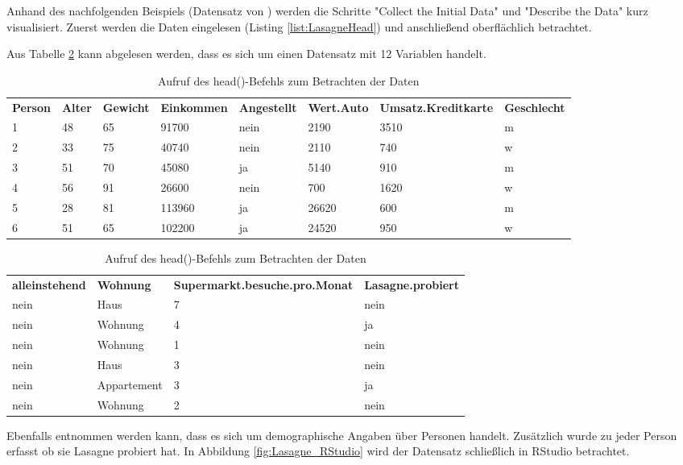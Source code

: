 Anhand des nachfolgenden Beispiels (Datensatz von \citep[Case Lasagne Test.xlsx]{hertle_datenanalyse_2016}) werden die Schritte "Collect the Initial Data" und "Describe the Data" kurz visualisiert. Zuerst werden die Daten eingelesen (Listing \ref{list:LasagneHead}) und anschließend oberflächlich betrachtet.

Aus Tabelle \ref{tab:LasagneHead:output} kann abgelesen werden, dass es sich um einen Datensatz mit 12 Variablen handelt. 
\begin{table}[H]
\centering
\begin{tabular}{|p{1cm}p{0.7cm}p{1.2cm}p{1.9cm}p{1.6cm}p{1.7cm}p{3.5cm}p{1.8cm}|}
  \hline
\textbf{Person} & \textbf{Alter} & \textbf{Gewicht} & \textbf{Einkommen} & \textbf{Angestellt} & \textbf{Wert.Auto} & \textbf{Umsatz.Kreditkarte} & \textbf{Geschlecht} \\ 
  \hhline{========}
1 &  48 &  65 & 91700 & nein & 2190 & 3510 & m\\ 
2 &  33 &  75 & 40740 & nein & 2110 & 740& w\\ 
3 &  51 &  70 & 45080 & ja & 5140 & 910 & m\\ 
4 &  56 &  91 & 26600 & nein & 700 & 1620 & w\\ 
5 &  28 &  81 & 113960 & ja & 26620 & 600 & m\\ 
6 &  51 &  65 & 102200 & ja & 24520 & 950 & w\\ 
\hline
\end{tabular}
\begin{tabular}{|p{2.2cm}p{2.1cm}p{5.8cm}p{3cm}|}
  \hline
\textbf{alleinstehend} & \textbf{Wohnung} & \textbf{Supermarkt.besuche.pro.Monat} & \textbf{Lasagne.probiert}\\ 
  \hhline{====}
nein & Haus &   7 & nein\\ 
nein & Wohnung &   4 & ja\\ 
nein & Wohnung &   1 & nein\\ 
nein & Haus &   3 & nein\\ 
nein & Appartement &   3 & ja\\ 
nein & Wohnung &   2 & nein\\ 
   \hline
\end{tabular}
\caption{Aufruf des head()-Befehls zum Betrachten der Daten}
\label{tab:LasagneHead:output}
\end{table}
Ebenfalls entnommen werden kann, dass es sich um demographische Angaben über Personen handelt. Zusätzlich wurde zu jeder Person erfasst ob sie Lasagne probiert hat. In Abbildung \ref{fig:Lasagne_RStudio} wird der Datensatz schließlich in RStudio betrachtet.
